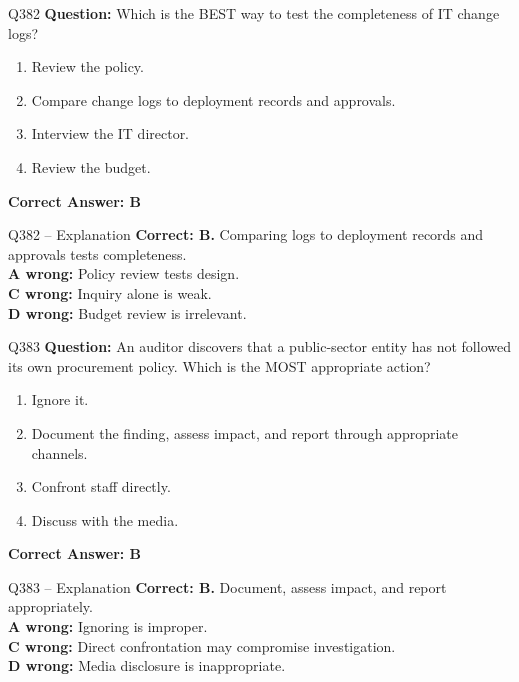 \documentclass[aspectratio=169,10pt]{beamer}
\begin{document}
	\begin{frame}[t]{Q382}
		\small
		\textbf{Question:} Which is the BEST way to test the completeness of IT change logs?
		\begin{enumerate}[label=\Alph*.,itemsep=1pt,topsep=2pt]
			\item Review the policy.
			\item Compare change logs to deployment records and approvals.
			\item Interview the IT director.
			\item Review the budget.
		\end{enumerate}
		\vspace{4pt}
		\textbf{Correct Answer: B}
	\end{frame}
	
	\begin{frame}[t]{Q382 -- Explanation}
		\small
		\textbf{Correct: B.} Comparing logs to deployment records and approvals tests completeness. \\[4pt]
		\textbf{A wrong:} Policy review tests design. \\[2pt]
		\textbf{C wrong:} Inquiry alone is weak. \\[2pt]
		\textbf{D wrong:} Budget review is irrelevant.
	\end{frame}
	
	\begin{frame}[t]{Q383}
		\small
		\textbf{Question:} An auditor discovers that a public-sector entity has not followed its own procurement policy. Which is the MOST appropriate action?
		\begin{enumerate}[label=\Alph*.,itemsep=1pt,topsep=2pt]
			\item Ignore it.
			\item Document the finding, assess impact, and report through appropriate channels.
			\item Confront staff directly.
			\item Discuss with the media.
		\end{enumerate}
		\vspace{4pt}
		\textbf{Correct Answer: B}
	\end{frame}
	
	\begin{frame}[t]{Q383 -- Explanation}
		\small
		\textbf{Correct: B.} Document, assess impact, and report appropriately. \\[4pt]
		\textbf{A wrong:} Ignoring is improper. \\[2pt]
		\textbf{C wrong:} Direct confrontation may compromise investigation. \\[2pt]
		\textbf{D wrong:} Media disclosure is inappropriate.
	\end{frame}
	
\end{document}
